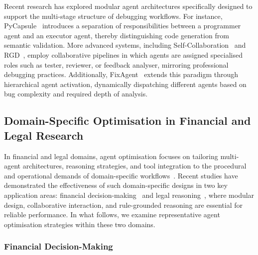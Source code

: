 \documentclass[]{selfevolagent}
\theoremstyle{plain}
\theoremstyle{definition}
\theoremstyle{remark}
\begin{document}
Recent research has explored modular agent architectures specifically designed to support the multi-stage structure of debugging workflows. For instance, PyCapsule~\citep{adnan2025large} introduces a separation of responsibilities between a programmer agent and an executor agent, thereby distinguishing code generation from semantic validation. More advanced systems, including Self-Collaboration~\citep{dong2024self} and RGD~\citep{jin2024rgd}, employ collaborative pipelines in which agents are assigned specialised roles such as tester, reviewer, or feedback analyser, mirroring professional debugging practices. Additionally, FixAgent~\citep{lee2024unifieddebuggingapproachllmbased} extends this paradigm through hierarchical agent activation, dynamically dispatching different agents based on bug complexity and required depth of analysis. 



\subsection{Domain-Specific Optimisation in Financial and Legal Research}

In financial and legal domains, agent optimisation focuses on tailoring multi-agent architectures, reasoning strategies, and tool integration to the procedural and operational demands of domain-specific workflows~\citep{sun2024lawluo,he2024agentscourt,li2025hedgeagents}. Recent studies have demonstrated the effectiveness of such domain-specific designs in two key application areas: financial decision-making~\citep{li2023tradinggpt,yu2024fincon,wang2024peer} and legal reasoning~\citep{di2023multi,chen2024agentcourt}, where modular design, collaborative interaction, and rule-grounded reasoning are essential for reliable performance. In what follows, we examine representative agent optimisation strategies within these two domains.



\subsubsection{Financial Decision-Making}
\end{document}

